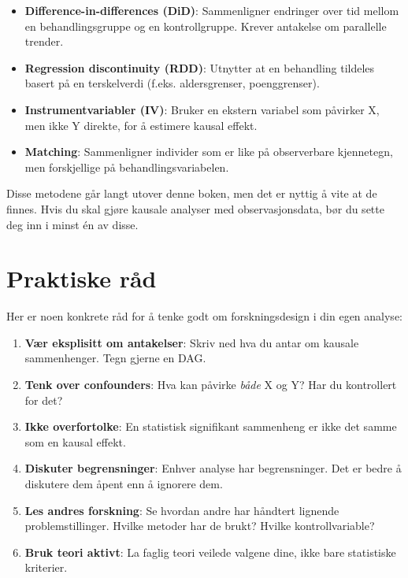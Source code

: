 \documentclass[
  norsk,
  letterpaper,
  DIV=11,
  numbers=noendperiod]{scrreprt}
\providecommand{\tightlist}{%
  \setlength{\itemsep}{0pt}\setlength{\parskip}{0pt}}
\theoremstyle{definition}
\theoremstyle{remark}
\begin{document}
\begin{itemize}
\tightlist
\item
  \textbf{Difference-in-differences (DiD)}: Sammenligner endringer over
  tid mellom en behandlingsgruppe og en kontrollgruppe. Krever antakelse
  om parallelle trender.
\item
  \textbf{Regression discontinuity (RDD)}: Utnytter at en behandling
  tildeles basert på en terskelverdi (f.eks. aldersgrenser,
  poenggrenser).
\item
  \textbf{Instrumentvariabler (IV)}: Bruker en ekstern variabel som
  påvirker X, men ikke Y direkte, for å estimere kausal effekt.
\item
  \textbf{Matching}: Sammenligner individer som er like på observerbare
  kjennetegn, men forskjellige på behandlingsvariabelen.
\end{itemize}

Disse metodene går langt utover denne boken, men det er nyttig å vite at
de finnes. Hvis du skal gjøre kausale analyser med observasjonsdata, bør
du sette deg inn i minst én av disse.

\section{Praktiske råd}\label{praktiske-ruxe5d}

Her er noen konkrete råd for å tenke godt om forskningsdesign i din egen
analyse:

\begin{enumerate}
\def\labelenumi{\arabic{enumi}.}
\tightlist
\item
  \textbf{Vær eksplisitt om antakelser}: Skriv ned hva du antar om
  kausale sammenhenger. Tegn gjerne en DAG.
\item
  \textbf{Tenk over confounders}: Hva kan påvirke \emph{både} X og Y?
  Har du kontrollert for det?
\item
  \textbf{Ikke overfortolke}: En statistisk signifikant sammenheng er
  ikke det samme som en kausal effekt.
\item
  \textbf{Diskuter begrensninger}: Enhver analyse har begrensninger. Det
  er bedre å diskutere dem åpent enn å ignorere dem.
\item
  \textbf{Les andres forskning}: Se hvordan andre har håndtert lignende
  problemstillinger. Hvilke metoder har de brukt? Hvilke
  kontrollvariable?
\item
  \textbf{Bruk teori aktivt}: La faglig teori veilede valgene dine, ikke
  bare statistiske kriterier.
\end{enumerate}
\end{document}
